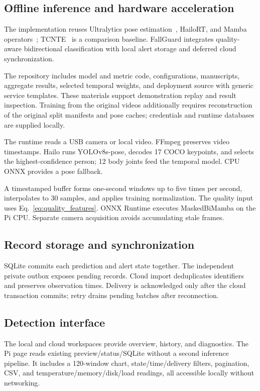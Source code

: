 \subsection{Offline inference and hardware acceleration}

The implementation reuses Ultralytics pose estimation~\cite{ultralyticsPose}, HailoRT, and Mamba operators~\cite{gu2023mamba}; TCNTE~\cite{yu2025tcnte} is a comparison baseline. FallGuard integrates quality-aware bidirectional classification with local alert storage and deferred cloud synchronization.

The repository includes model and metric code, configurations, manuscripts, aggregate results, selected temporal weights, and deployment source with generic service templates. These materials support demonstration replay and result inspection. Training from the original videos additionally requires reconstruction of the original split manifests and pose caches; credentials and runtime databases are supplied locally.

The runtime reads a USB camera or local video. FFmpeg preserves video timestamps. Hailo runs YOLOv8s-pose, decodes 17 COCO keypoints, and selects the highest-confidence person; 12 body joints feed the temporal model. CPU ONNX provides a pose fallback.

A timestamped buffer forms one-second windows up to five times per second, interpolates to 30 samples, and applies training normalization. The quality input uses Eq.~\eqref{eq:quality_features}. ONNX Runtime executes MaskedBiMamba on the Pi CPU. Separate camera acquisition avoids accumulating stale frames.

\subsection{Record storage and synchronization}

SQLite commits each prediction and alert state together. The independent private outbox exposes pending records. Cloud import deduplicates identifiers and preserves observation times. Delivery is acknowledged only after the cloud transaction commits; retry drains pending batches after reconnection.

\subsection{Detection interface}

The local and cloud workspaces provide overview, history, and diagnostics. The Pi page reads existing preview/status/SQLite without a second inference pipeline. It includes a 120-window chart, state/time/delivery filters, pagination, CSV, and temperature/memory/disk/load readings, all accessible locally without networking.

